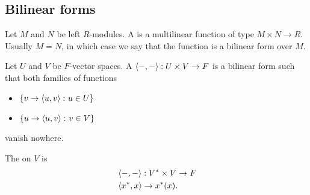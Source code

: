 \subsection{Bilinear forms}\label{subsec:bilinear_forms}

\begin{definition}\label{def:bilinear_form}\cite[249]{Knapp2016BAlg}
  Let \( M \) and \( N \) be left \( R \)-modules. A  is a multilinear function of type \( M \times N \to R \). Usually \( M = N \), in which case we say that the function is a bilinear form over \( M \).
\end{definition}

\begin{definition}\label{def:duality_pairing}
  Let \( U \) and \( V \) be \( F \)-vector spaces. A  \( \left\langle -, - \right\rangle: U \times V \to F \) is a bilinear form such that both families of functions
  \begin{itemize}
    \item \( \{ v \to \left\langle u, v \right\rangle \colon u \in U \} \)
    \item \( \{ u \to \left\langle u, v \right\rangle \colon v \in V \} \)
  \end{itemize}
  vanish nowhere.

  The  on \( V \) is
  \begin{align*}
    &\left\langle -, - \right\rangle: V^* \times V \to F \\
    &\left\langle x^*, x \right\rangle \to x^*(x).
  \end{align*}
\end{definition}
